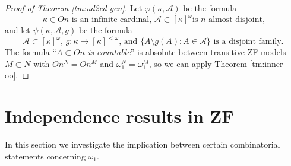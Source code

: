 \documentclass[a4paper,10pt,reqno]{amsart}
\numberwithin{equation}{section}
\theoremstyle{definition}
\theoremstyle{remark}
\newcommand{\mc}[1]{\mathcal{#1}}
\newcommand{\setm}{\setminus}
\newcommand{\subs}{\subset}
\begin{document}
            \begin{proof}[Proof of Theorem \ref{tm:ud2ed-gen}]
                Let ${\varphi}({\kappa},\mc A)$ be the formula 
                \begin{displaymath}
                \text{${\kappa}\in On$ is an infinite cardinal, 
                $\mc A\subs {[{\kappa}]}^{{\omega}}$
                is $n$-almost disjoint},
                \end{displaymath}
                and let ${\psi}({\kappa},\mc A,g)$ be the formula 
                \begin{displaymath}
                \text{$\mc A\subs {[{\kappa}]}^{{\omega}}$, $g:{\kappa}\to {[{\kappa}]}^{<{\omega}}$,  and 
                $\{A\setm g(A):A\in \mc A\}$ is a disjoint family.  }
                \end{displaymath}
            The formula ``{\em $A\subs On$ is countable}'' is absolute 
            between transitive ZF models $M\subs N$ with $On^N=On^M$ and ${\omega}_1^N={\omega}_1^M$,
            so we can apply Theorem \ref{tm:inner-oo}.
            \end{proof}
            



\section{Independence results in ZF}\label{sc:ind}

In this section we investigate the implication between  
certain combinatorial statements concerning ${\omega}_1$.  
\end{document}
